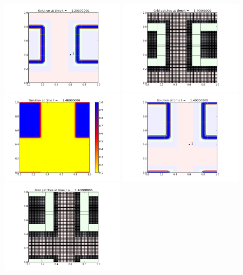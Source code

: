 \documentclass[11pt]{article}
\begin{document}
\includegraphics[width=0.475\textwidth]{frame0006fig1.png}
\vskip 10pt 
\includegraphics[width=0.475\textwidth]{frame0006fig2.png}
\vskip 10pt 
\includegraphics[width=0.475\textwidth]{frame0007fig0.png}
\includegraphics[width=0.475\textwidth]{frame0007fig1.png}
\vskip 10pt 
\includegraphics[width=0.475\textwidth]{frame0007fig2.png}
\end{document}

